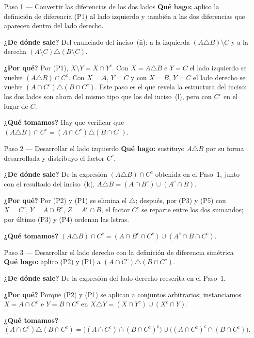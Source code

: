 \documentclass[11pt]{article}
\begin{document}
\begin{paso}{Paso 1 --- Convertir las diferencias de los dos lados}
\textbf{Qué hago:} aplico la definición de diferencia (P1) al lado izquierdo y también a las dos
diferencias que aparecen dentro del lado derecho.

\textbf{¿De dónde sale?} Del enunciado del inciso~(ñ): a la izquierda $(A\triangle B)\setminus C$
y a la derecha $(A\setminus C)\triangle(B\setminus C)$.

\textbf{¿Por qué?} Por (P1), $X\setminus Y=X\cap Y^{c}$. Con $X=A\triangle B$ e $Y=C$ el lado
izquierdo se vuelve $(A\triangle B)\cap C^{c}$. Con $X=A$, $Y=C$ y con $X=B$, $Y=C$ el lado
derecho se vuelve $(A\cap C^{c})\triangle(B\cap C^{c})$. Este paso es el que revela la estructura
del inciso: los dos lados son ahora del mismo tipo que los del inciso~(l), pero con $C^{c}$ en el
lugar de $C$.

\textbf{¿Qué tomamos?} Hay que verificar que
$(A\triangle B)\cap C^{c}=(A\cap C^{c})\triangle(B\cap C^{c})$.
\end{paso}

\begin{paso}{Paso 2 --- Desarrollar el lado izquierdo}
\textbf{Qué hago:} sustituyo $A\triangle B$ por su forma desarrollada y distribuyo el factor
$C^{c}$.

\textbf{¿De dónde sale?} De la expresión $(A\triangle B)\cap C^{c}$ obtenida en el Paso~1, junto
con el resultado del inciso~(k), $A\triangle B=(A\cap B^{c})\cup(A^{c}\cap B)$.

\textbf{¿Por qué?} Por (P2) y (P1) se elimina el $\triangle$; después, por (P3) y (P5) con
$X=C^{c}$, $Y=A\cap B^{c}$, $Z=A^{c}\cap B$, el factor $C^{c}$ se reparte entre los dos
sumandos; por último (P3) y (P4) ordenan las letras.

\textbf{¿Qué tomamos?}
$(A\triangle B)\cap C^{c}=(A\cap B^{c}\cap C^{c})\cup(A^{c}\cap B\cap C^{c})$.
\end{paso}

\begin{paso}{Paso 3 --- Desarrollar el lado derecho con la definición de diferencia simétrica}
\textbf{Qué hago:} aplico (P2) y (P1) a $(A\cap C^{c})\triangle(B\cap C^{c})$.

\textbf{¿De dónde sale?} De la expresión del lado derecho reescrita en el Paso~1.

\textbf{¿Por qué?} Porque (P2) y (P1) se aplican a conjuntos arbitrarios; instanciamos
$X=A\cap C^{c}$ e $Y=B\cap C^{c}$ en $X\triangle Y=(X\cap Y^{c})\cup(X^{c}\cap Y)$.

\textbf{¿Qué tomamos?}
\[
(A\cap C^{c})\triangle(B\cap C^{c})=
\bigl((A\cap C^{c})\cap(B\cap C^{c})^{c}\bigr)\cup\bigl((A\cap C^{c})^{c}\cap(B\cap C^{c})\bigr).
\]
\end{paso}
\end{document}
